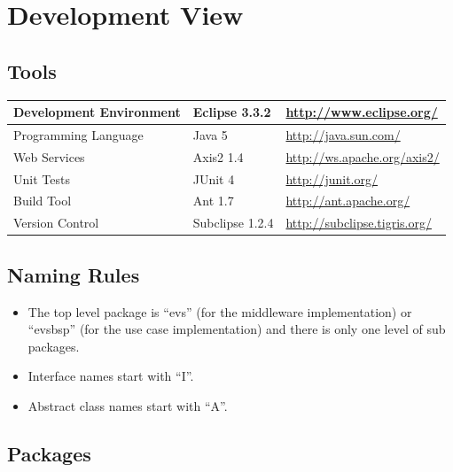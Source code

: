\documentclass[a4paper]{article}
\begin{document}


\section{Development View}

\subsection{Tools}

	\begin{tabular}{|l|l|l|}
	\hline
	Development Environment & Eclipse 3.3.2 & \url{http://www.eclipse.org/}\\
	\hline
	Programming Language & Java 5 & \url{http://java.sun.com/}\\
	\hline
	Web Services & Axis2 1.4 & \url{http://ws.apache.org/axis2/}\\
	\hline
	Unit Tests & JUnit 4 & \url{http://junit.org/}\\
	\hline
	Build Tool & Ant 1.7 & \url{http://ant.apache.org/}\\
	\hline
	Version Control & Subclipse 1.2.4 & \url{http://subclipse.tigris.org/}\\
	\hline
	\end{tabular}

\subsection{Naming Rules}

\begin{itemize}
\item The top level package is ``evs'' (for the middleware implementation) or ``evsbsp'' (for the use case implementation) and there is only one level of sub packages.
\item Interface names start with ``I''.
\item Abstract class names start with ``A''.
\end{itemize}

\subsection{Packages}
\end{document}
